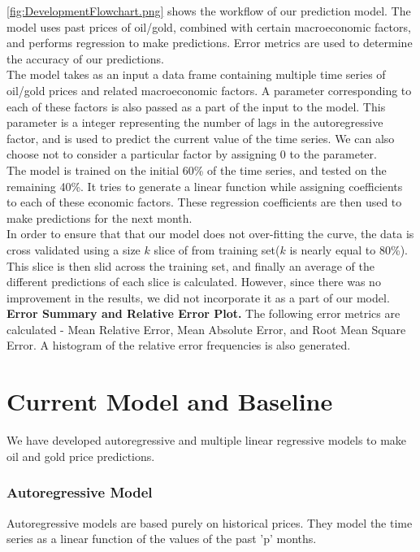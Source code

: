\documentclass[runningheads]{llncs}
\begin{document}
\noindent \autoref{fig:DevelopmentFlowchart.png} shows the workflow of our prediction model. The model uses past prices of oil/gold, combined with certain macroeconomic factors, and performs regression to make predictions. Error metrics are used to determine the accuracy of our predictions.\\

\noindent The model takes as an input a data frame containing multiple time series of oil/gold prices and related macroeconomic factors. A parameter corresponding to each of these factors is also passed as a part of the input to the model. This parameter is a integer representing the number of lags in the autoregressive factor, and is used to predict the current value of the time series. We can also choose not to consider a particular factor by assigning $0$ to the parameter.\\

\noindent The model is trained on the initial 60\% of the time series, and tested on the remaining 40\%. It tries to generate a linear function while assigning coefficients to each of these economic factors. These regression coefficients are then used to make predictions for the next month. \\

\noindent In order to ensure that that our model does not over-fitting the curve, the data is cross validated using a size $k$ slice of from training set($k$ is nearly equal to 80\%). This slice is then slid across the training set, and finally an average of the different predictions of each slice is calculated. However, since there was no improvement in the results, we did not incorporate it as a part of our model.\\ 

\noindent \textbf	{Error Summary and Relative Error Plot.} The following error metrics are calculated - Mean Relative Error, Mean Absolute Error, and Root Mean Square Error. A histogram of the relative error frequencies is also generated. \\

\section{Current Model and Baseline}

We have developed autoregressive and multiple linear regressive models to make oil and gold price predictions.

\subsubsection{Autoregressive Model}
Autoregressive models are based purely on historical prices. They model the time series as a linear function of the values of the past 'p' months.\\
\end{document}
